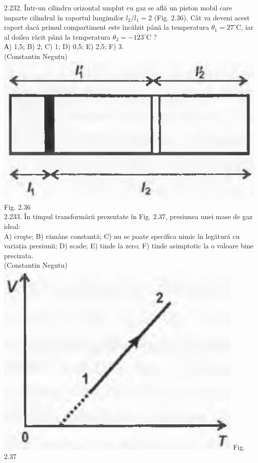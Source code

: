 \documentclass[10pt]{article}
\begin{document}
2.232. Într-un cilindru orizontal umplut cu gaz se află un piston mobil care imparte cilindrul în raportul lungimilor $l_{2} / l_{1}=2$ (Fig. 2.36). Cât va deveni acest raport dacă primul compartiment este încălzit până la temperatura $\theta_{1}=27^{\circ} \mathrm{C}$, iar al doilea răcit până la temperatura $\theta_{2}=-123^{\circ} \mathrm{C}$ ?\\ А) 1,5; B) 2; C) 1; D) 0,5; E) 2,5; F) 3.\\ (Constantin Neguțu)\\ \includegraphics[max width=\textwidth, center]{2025_07_01_5b3ff9fa0d508c8e9f17g-126(1)} Fig. 2.36\\

2.233. În timpul transformării prezentate în Fig. 2.37, presiunea unei mase de gaz ideal:\\ A) creşte; B) rămâne constantă; C) nu se poate specifica nimic în legătură cu variația presiunii; D) scade; E) tinde la zero; F) tinde asimptotic la o valoare bine precizata.\\ (Constantin Negutu)\\ \includegraphics[max width=\textwidth, center]{2025_07_01_5b3ff9fa0d508c8e9f17g-126} Fig. 2.37\\
\end{document}
